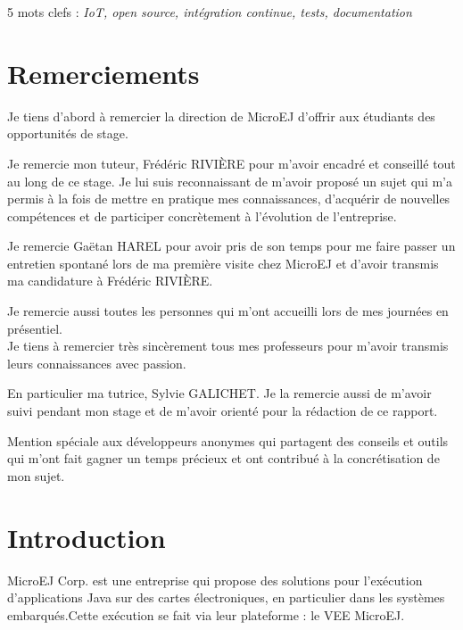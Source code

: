 \documentclass[french,a4paper,12pt]{report}
\begin{document}
\vspace*{\fill}

5 mots clefs : \textit{IoT, open source, intégration continue, tests, documentation}

\chapter*{Remerciements}

Je tiens d’abord à remercier la direction de MicroEJ d'offrir aux étudiants des opportunités de stage. 

Je remercie mon tuteur, Frédéric RIVIÈRE pour m'avoir encadré et conseillé tout au long de ce stage. Je lui suis reconnaissant de m'avoir proposé un sujet qui m'a permis à la fois de mettre en pratique mes connaissances, d’acquérir de nouvelles compétences et de participer concrètement à l'évolution de l'entreprise.
 
Je remercie Gaëtan HAREL pour avoir pris de son temps pour me faire passer un entretien spontané lors de ma première visite chez MicroEJ et d'avoir transmis ma candidature à Frédéric RIVIÈRE.

Je remercie aussi toutes les personnes qui m'ont accueilli lors de mes journées en présentiel.\\

Je tiens à remercier très sincèrement tous mes professeurs pour m'avoir transmis leurs connaissances avec passion.

En particulier ma tutrice, Sylvie GALICHET. Je la remercie aussi de m'avoir suivi pendant mon stage et de m'avoir orienté pour la rédaction de ce rapport.\\

\vspace*{\fill}

Mention spéciale aux développeurs anonymes qui partagent des conseils et outils qui m'ont fait gagner un temps précieux et ont contribué à la concrétisation de mon sujet.


\chapter{Introduction}

MicroEJ Corp. est une entreprise qui propose des solutions pour l’exécution d’applications Java sur des cartes électroniques, en particulier dans les systèmes embarqués.Cette exécution se fait via leur plateforme : le VEE MicroEJ.
\end{document}
